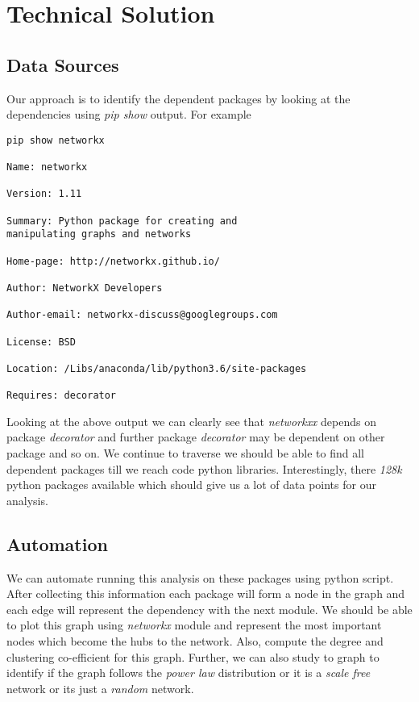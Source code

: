 \section{Technical Solution} \label{techsoln}

\subsection{Data Sources} \label{datasources}
 Our approach is to identify the dependent packages by looking
 at the dependencies using \textit{pip show} output. For example
 \begin{lstlisting}
pip show networkx

Name: networkx

Version: 1.11

Summary: Python package for creating and 
manipulating graphs and networks

Home-page: http://networkx.github.io/

Author: NetworkX Developers

Author-email: networkx-discuss@googlegroups.com

License: BSD

Location: /Libs/anaconda/lib/python3.6/site-packages

Requires: decorator
 \end{lstlisting}
 Looking at the above output we can clearly see that \textit{networkxx}
 depends on package \textit{decorator} and further package \textit{decorator}
 may be dependent on other package and so on. We continue to traverse
 we should be able to find all dependent packages till we reach code python
 libraries. Interestingly, there \textit{128k} python packages available
 \cite{www-python-org} which should give us a lot of data points for our
 analysis.

\subsection{Automation} \label{automation}
 We can automate running this analysis on these packages using python script. After 
 collecting this information each package will form a node in the graph and each
 edge will represent the dependency with the next module. We should be able
 to plot this graph using \textit{networkx} module and represent the most important nodes
 which become the hubs to the network. Also, compute the degree and clustering 
 co-efficient for this graph. Further, we can also study to graph to identify if the graph 
 follows the \textit{power law} distribution or it is a \textit{scale free} network or its
 just a \textit{random} network.

